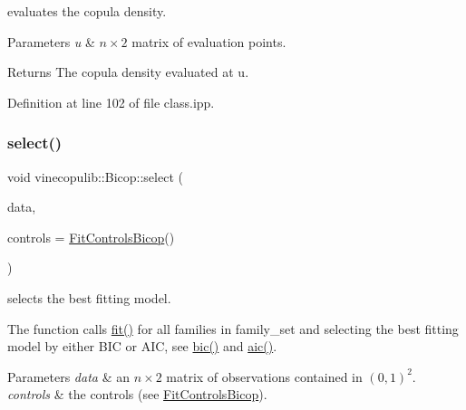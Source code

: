 evaluates the copula density. 


\begin{DoxyParams}{Parameters}
{\em u} & $n \times 2$ matrix of evaluation points. \\
\hline
\end{DoxyParams}
\begin{DoxyReturn}{Returns}
The copula density evaluated at {\ttfamily u}. 
\end{DoxyReturn}


Definition at line 102 of file class.\+ipp.

\mbox{\label{classvinecopulib_1_1_bicop_a40e37a67480de2990821580eb09ba354}} 
\subsubsection{\texorpdfstring{select()}{select()}}
{\footnotesize\ttfamily void vinecopulib\+::\+Bicop\+::select (\begin{DoxyParamCaption}\item[{const Eigen\+::\+Matrix$<$ double, Eigen\+::\+Dynamic, 2 $>$ \&}]{data,  }\item[{\hyperlink{classvinecopulib_1_1_fit_controls_bicop}{Fit\+Controls\+Bicop}}]{controls = {\ttfamily \hyperlink{classvinecopulib_1_1_fit_controls_bicop}{Fit\+Controls\+Bicop}()} }\end{DoxyParamCaption})\hspace{0.3cm}{\ttfamily [inline]}}



selects the best fitting model. 

The function calls \hyperlink{classvinecopulib_1_1_bicop_ac95738f7f2ec4e008404f5621030efc1}{fit()} for all families in {\ttfamily family\+\_\+set} and selecting the best fitting model by either B\+IC or A\+IC, see \hyperlink{classvinecopulib_1_1_bicop_a5ad96c73be4b32846792203a9dee1c53}{bic()} and \hyperlink{classvinecopulib_1_1_bicop_a6d5907e8fcc38c3be57712a26b562a39}{aic()}.


\begin{DoxyParams}{Parameters}
{\em data} & an $ n \times 2 $ matrix of observations contained in $(0, 1)^2 $. \\
\hline
{\em controls} & the controls (see \hyperlink{classvinecopulib_1_1_fit_controls_bicop}{Fit\+Controls\+Bicop}). \\
\hline
\end{DoxyParams}



